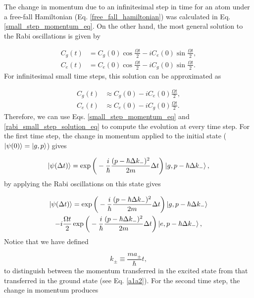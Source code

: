 \documentclass{article}
\begin{document}
The change in momentum due to an infinitesimal step in time for an atom under a free-fall Hamiltonian (Eq. \ref{free_fall_hamiltonian}) was calculated in Eq. \ref{small_step_momentum_eq}. On the other hand, the most general solution to the Rabi oscillations is given by \cite{sakurai2017modern}

\begin{equation}
    \begin{aligned}
        C_{g}(t) & = C_{g}(0) \cos{\frac{\Omega t}{2}} - i  C_{e}(0) \sin{\frac{\Omega t}{2}}, \\ C_{e}(t) &= C_{e}(0) \cos{\frac{\Omega t}{2}} - i  C_{g}(0) \sin{\frac{\Omega t}{2}}.
    \end{aligned}
\end{equation}
%
For infinitesimal small time steps, this solution can be approximated as

\begin{equation}\label{rabi_small_step_solution_eq}
    \begin{aligned}
        C_{g}(t) & \approx C_{g}(0) - i  C_{e}(0) \frac{\Omega t}{2}, \\ C_{e}(t) &\approx C_{e}(0) - i  C_{g}(0) \frac{\Omega t}{2}.
    \end{aligned}
\end{equation}
%
Therefore, we can use Eqs. \ref{small_step_momentum_eq} and \ref{rabi_small_step_solution_eq} to compute the evolution at every time step. For the first time step, the change in momentum applied to the initial state ($\ket{\psi (0)} = \ket{g, p}$) gives

\begin{equation*}
    \ket{\psi (\Delta t)} = \exp \bigg( -\frac{i}{\hbar} \frac{(p-\hbar \Delta k_{-})^{2}}{2m} \Delta t \bigg)\ket{g, p-\hbar \Delta k_{-}},
\end{equation*}
%
by applying the Rabi oscillations on this state gives

\begin{multline*}
    \ket{\psi (\Delta t)} = \exp \bigg( -\frac{i}{\hbar} \frac{(p-\hbar \Delta k_{-})^{2}}{2m} \Delta t \bigg)\ket{g, p-\hbar \Delta k_{-}}
    \\ - i \frac{\Omega t}{2} \exp \bigg( -\frac{i}{\hbar} \frac{(p-\hbar \Delta k_{-})^{2}}{2m} \Delta t \bigg)\ket{e, p-\hbar \Delta k_{-}},
\end{multline*}
%
Notice that we have defined

\begin{equation}
    k_{\pm} \equiv \frac{m a_{\pm}}{\hbar} t,
\end{equation}
%
to distinguish between the momentum transferred in the excited state from that transferred in the ground state (see Eq. \ref{a1a2}). For the second time step, the change in momentum produces
\end{document}
